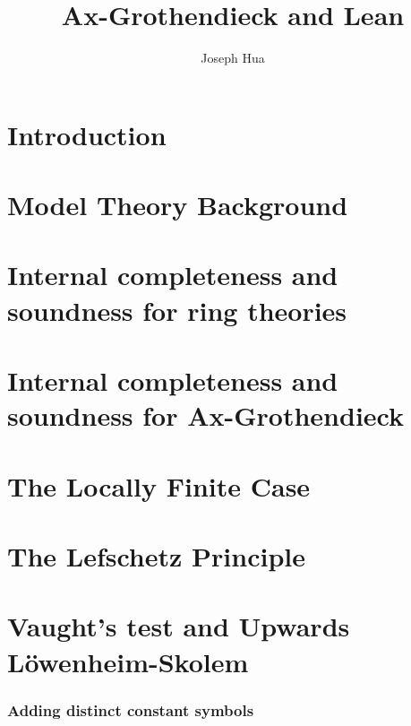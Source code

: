 \documentclass{article}
\newcommand{\<}{\langle}
\renewcommand{\>}{\rangle}
\theoremstyle{definitionstyle}
\theoremstyle{exercisestyle}
\theoremstyle{remarkstyle}
\begin{document}
\title{Ax-Grothendieck and Lean}
\author{Joseph Hua}
\maketitle

\tableofcontents

\newpage
\section{Introduction}


\section{Model Theory Background}


\section{Internal completeness and soundness for ring theories}


\section{Internal completeness and soundness
  for Ax-Grothendieck}


\section{The Locally Finite Case}


\section{The Lefschetz Principle}


\section{Vaught's test and Upwards L\"{o}wenheim-Skolem}


\subsubsection{Adding distinct constant symbols}

\end{document}
